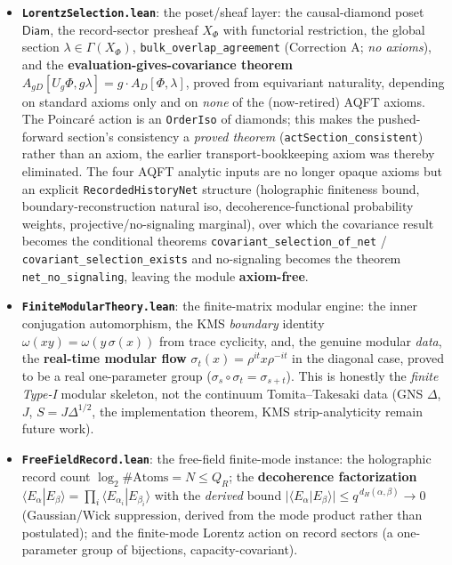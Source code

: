 \documentclass[11pt,a4paper]{article}
\begin{document}
\begin{itemize}
  \item \textbf{\texttt{LorentzSelection.lean}}: the poset/sheaf layer: the causal-diamond poset $\mathsf{Diam}$, the record-sector presheaf $X_\Phi$ with functorial restriction, the global section $\lambda \in \Gamma(X_\Phi)$, \texttt{bulk\_overlap\_agreement} (Correction A; \emph{no axioms}), and the \textbf{evaluation-gives-covariance theorem} $A_{gD}[U_g\Phi,g\lambda] = g\cdot A_D[\Phi,\lambda]$, proved from equivariant naturality, depending on standard axioms only and on \emph{none} of the (now-retired) AQFT axioms. The Poincaré action is an \texttt{OrderIso} of diamonds; this makes the pushed-forward section's consistency a \emph{proved theorem} (\texttt{actSection\_consistent}) rather than an axiom, the earlier transport-bookkeeping axiom was thereby eliminated. The four AQFT analytic inputs are no longer opaque axioms but an explicit \texttt{RecordedHistoryNet} structure (holographic finiteness bound, boundary-reconstruction natural iso, decoherence-functional probability weights, projective/no-signaling marginal), over which the covariance result becomes the conditional theorems \texttt{covariant\_selection\_of\_net} / \texttt{covariant\_selection\_exists} and no-signaling becomes the theorem \texttt{net\_no\_signaling}, leaving the module \textbf{axiom-free}.
  \item \textbf{\texttt{FiniteModularTheory.lean}}: the finite-matrix modular engine: the inner conjugation automorphism, the KMS \emph{boundary} identity $\omega(xy)=\omega(y\,\sigma(x))$ from trace cyclicity, and, the genuine modular \emph{data}, the \textbf{real-time modular flow} $\sigma_t(x)=\rho^{it}x\rho^{-it}$ in the diagonal case, proved to be a real one-parameter group ($\sigma_s\circ\sigma_t=\sigma_{s+t}$). This is honestly the \emph{finite Type-I} modular skeleton, not the continuum Tomita–Takesaki data (GNS $\Delta$, $J$, $S=J\Delta^{1/2}$, the implementation theorem, KMS strip-analyticity remain future work).
  \item \textbf{\texttt{FreeFieldRecord.lean}}: the free-field finite-mode instance: the holographic record count $\log_2 \#\mathrm{Atoms} = N \le Q_R$; the \textbf{decoherence factorization} $\langle E_\alpha|E_\beta\rangle = \prod_i \langle E_{\alpha_i}|E_{\beta_i}\rangle$ with the \emph{derived} bound $|\langle E_\alpha|E_\beta\rangle| \le q^{\,d_H(\alpha,\beta)} \to 0$ (Gaussian/Wick suppression, derived from the mode product rather than postulated); and the finite-mode Lorentz action on record sectors (a one-parameter group of bijections, capacity-covariant).

\end{itemize}
\end{document}
